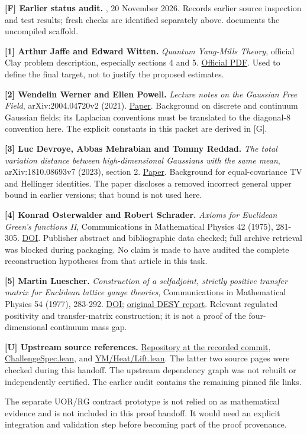 \documentclass[
  11pt,
  letterpaper,
]{article}
\begin{document}
\textbf{{[}F{]} Earlier status audit.}
, 20 November 2026. Records
earlier source inspection and test results; fresh checks are identified
separately above.  documents the
uncompiled scaffold.

\textbf{{[}1{]} Arthur Jaffe and Edward Witten.} \emph{Quantum
Yang-Mills Theory}, official Clay problem description, especially
sections 4 and 5.
\href{https://www.claymath.org/wp-content/uploads/2022/06/yangmills.pdf}{Official
PDF}. Used to define the final target, not to justify the proposed
estimates.

\textbf{{[}2{]} Wendelin Werner and Ellen Powell.} \emph{Lecture notes
on the Gaussian Free Field}, arXiv:2004.04720v2 (2021).
\href{https://arxiv.org/abs/2004.04720v2}{Paper}. Background on discrete
and continuum Gaussian fields; its Laplacian conventions must be
translated to the diagonal-8 convention here. The explicit constants in
this packet are derived in {[}G{]}.

\textbf{{[}3{]} Luc Devroye, Abbas Mehrabian and Tommy Reddad.}
\emph{The total variation distance between high-dimensional Gaussians
with the same mean}, arXiv:1810.08693v7 (2023), section 2.
\href{https://arxiv.org/abs/1810.08693v7}{Paper}. Background for
equal-covariance TV and Hellinger identities. The paper discloses a
removed incorrect general upper bound in earlier versions; that bound is
not used here.

\textbf{{[}4{]} Konrad Osterwalder and Robert Schrader.} \emph{Axioms
for Euclidean Green's functions II}, Communications in Mathematical
Physics 42 (1975), 281-305.
\href{https://doi.org/10.1007/BF01608978}{DOI}. Publisher abstract and
bibliographic data checked; full archive retrieval was blocked during
packaging. No claim is made to have audited the complete reconstruction
hypotheses from that article in this task.

\textbf{{[}5{]} Martin Luescher.} \emph{Construction of a selfadjoint,
strictly positive transfer matrix for Euclidean lattice gauge theories},
Communications in Mathematical Physics 54 (1977), 283-292.
\href{https://doi.org/10.1007/BF01614090}{DOI};
\href{https://bib-pubdb1.desy.de/record/396349/files/7611148.pdf}{original
DESY report}. Relevant regulated positivity and transfer-matrix
construction; it is not a proof of the four-dimensional continuum mass
gap.

\textbf{{[}U{]} Upstream source references.}
\href{https://github.com/yang-mills-group/OpenAI-YM-20261028/tree/3456e5e75cf8d4cd558955a5c7638fba2d68f464}{Repository
at the recorded commit},
\href{https://github.com/yang-mills-group/OpenAI-YM-20261028/blob/3456e5e75cf8d4cd558955a5c7638fba2d68f464/ChallengeSpec.lean}{ChallengeSpec.lean},
and
\href{https://github.com/yang-mills-group/OpenAI-YM-20261028/blob/3456e5e75cf8d4cd558955a5c7638fba2d68f464/YM/Heat/Lift.lean}{YM/Heat/Lift.lean}.
The latter two source pages were checked during this handoff. The
upstream dependency graph was not rebuilt or independently certified.
The earlier audit contains the remaining pinned file links.

The separate UOR/RG contract prototype is not relied on as mathematical
evidence and is not included in this proof handoff. It would need an
explicit integration and validation step before becoming part of the
proof provenance.
\end{document}
